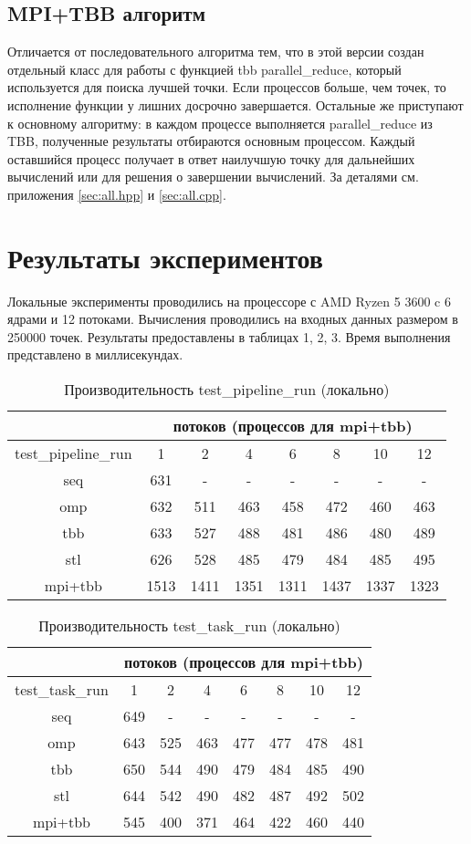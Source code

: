 \documentclass[12pt,a4paper]{extarticle}
\begin{document}
\subsection{MPI+TBB алгоритм}
Отличается от последовательного алгоритма тем, что в этой версии создан отдельный класс для работы с функцией tbb parallel\_reduce, который используется для поиска лучшей точки.
Если процессов больше, чем точек, то исполнение функции у лишних досрочно завершается. Остальные же приступают к основному алгоритму: в каждом процессе выполняется parallel\_reduce из TBB, полученные результаты отбираются основным процессом. Каждый оставшийся процесс получает в ответ наилучшую точку для дальнейших вычислений или для решения о завершении вычислений.
За деталями см. приложения \ref{sec:all.hpp} и \ref{sec:all.cpp}.

\newpage
\section{Результаты экспериментов}
Локальные эксперименты проводились на процессоре с AMD Ryzen 5 3600 c 6 ядрами и 12 потоками. Вычисления проводились на входных данных размером в 250000 точек.
Результаты предоставлены в таблицах 1, 2, 3. Время выполнения представлено в миллисекундах.

\begin{table}[H]
\centering
\begin{tabular}{|c|c|c|c|c|c|c|c|} \hline
 & \multicolumn{7}{|c|}{потоков (процессов для mpi+tbb)}\\
\hline
test\_pipeline\_run & 1 & 2 & 4 & 6 & 8 & 10 & 12 \\
\hline
seq & 631 &  -&-&-&-&-&-\\
\hline
omp & 632 & 511 & 463 & 458 & 472 & 460 & 463 \\
\hline
tbb & 633 & 527 & 488 & 481 & 486 & 480 & 489 \\
\hline
stl & 626 & 528 & 485 & 479 & 484 & 485 & 495 \\
\hline
mpi+tbb & 1513 & 1411 & 1351 & 1311 & 1437 & 1337 & 1323 \\
\hline
\end{tabular}
\caption{Производительность test\_pipeline\_run (локально)}
\end{table}

\begin{table}[H]
\centering
\begin{tabular}{|c|c|c|c|c|c|c|c|} \hline
 & \multicolumn{7}{|c|}{потоков (процессов для mpi+tbb)}\\
\hline 
test\_task\_run & 1 & 2 & 4 & 6 & 8 & 10 & 12 \\
\hline 
seq & 649 &  -&-&-&-&-&-\\
\hline 
omp & 643 & 525 & 463 & 477 & 477 & 478 & 481 \\
\hline 
tbb & 650 & 544 & 490 & 479 & 484 & 485 & 490 \\
\hline 
stl & 644 & 542 & 490 & 482 & 487 & 492 & 502 \\
\hline 
mpi+tbb & 545 & 400 & 371 & 464 & 422 & 460 & 440 \\
\hline 
\end{tabular}
\caption{Производительность test\_task\_run (локально)}
\end{table}
\end{document}
